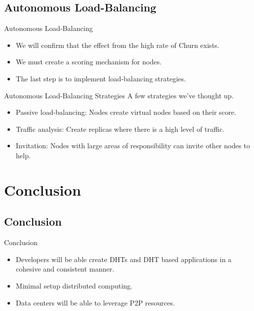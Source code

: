 \documentclass[11pt]{beamer}
\begin{document}
\subsection{Autonomous Load-Balancing}
\begin{frame}{Autonomous Load-Balancing}
	\begin{itemize}
		\item We will confirm that the effect from the high rate of Churn exists.
		\item We must create a scoring mechanism for nodes.
		\item The last step is to implement load-balancing strategies.
	\end{itemize}
\end{frame}

\begin{frame}{Autonomous Load-Balancing Strategies}
	A few strategies we've thought up.
	\begin{itemize}
		\item Passive load-balancing: Nodes create virtual nodes based on their score.
		\item Traffic analysis:  Create replicas where there is a high level of traffic.
		\item Invitation:  Nodes with large areas of responsibility can invite other nodes to help.
		
	\end{itemize}
\end{frame}


\section{Conclusion}

\subsection{Conclusion}

\begin{frame}{Conclusion}
	\begin{itemize}
		\item Developers will be able create DHTs and DHT based applications in a cohesive and consistent manner.
		\item Minimal setup distributed computing.
		\item Data centers will be able to leverage P2P resources.
	\end{itemize}
\end{frame}
\end{document}
